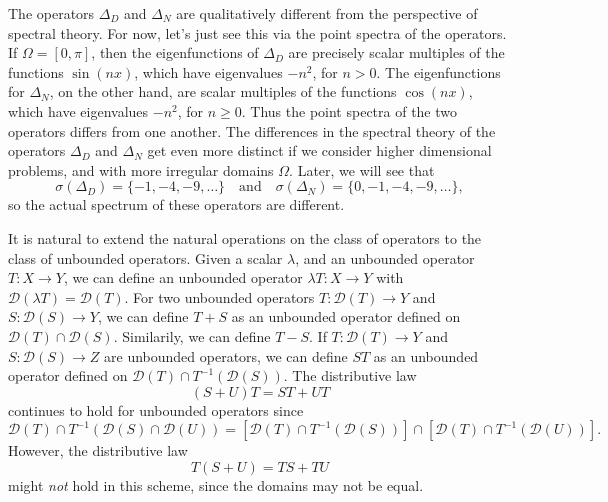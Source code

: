 The operators $\Delta_D$ and $\Delta_N$ are qualitatively different from the perspective of spectral theory. For now, let's just see this via the point spectra of the operators. If $\Omega = [0,\pi]$, then the eigenfunctions of $\Delta_D$ are precisely scalar multiples of the functions $\sin(nx)$, which have eigenvalues $-n^2$, for $n > 0$. The eigenfunctions for $\Delta_N$, on the other hand, are scalar multiples of the functions $\cos(nx)$, which have eigenvalues $-n^2$, for $n \geq 0$. Thus the point spectra of the two operators differs from one another. The differences in the spectral theory of the operators $\Delta_D$ and $\Delta_N$ get even more distinct if we consider higher dimensional problems, and with more irregular domains $\Omega$. Later, we will see that
%
\[ \sigma(\Delta_D) = \{ -1, -4, -9, \dots \} \quad\text{and}\quad \sigma(\Delta_N) = \{ 0, -1, -4, -9, \dots \}, \]
%
so the actual spectrum of these operators are different.

It is natural to extend the natural operations on the class of operators to the class of unbounded operators. Given a scalar $\lambda$, and an unbounded operator $T: X \to Y$, we can define an unbounded operator $\lambda T: X \to Y$ with $\mathcal{D}(\lambda T) = \mathcal{D}(T)$. For two unbounded operators $T: \mathcal{D}(T) \to Y$ and $S: \mathcal{D}(S) \to Y$, we can define $T + S$ as an unbounded operator defined on $\mathcal{D}(T) \cap \mathcal{D}(S)$. Similarily, we can define $T - S$. If $T: \mathcal{D}(T) \to Y$ and $S: \mathcal{D}(S) \to Z$ are unbounded operators, we can define $ST$ as an unbounded operator defined on $\mathcal{D}(T) \cap T^{-1}(\mathcal{D}(S))$. The distributive law
%
\[ (S + U)T = ST + UT \]
%
continues to hold for unbounded operators since
%
\[ \mathcal{D}(T) \cap T^{-1}(\mathcal{D}(S) \cap \mathcal{D}(U)) = \left[ \mathcal{D}(T) \cap T^{-1}(\mathcal{D}(S)) \right] \cap \left[ \mathcal{D}(T) \cap T^{-1}(\mathcal{D}(U)) \right]. \]
%
However, the distributive law
%
\[ T(S + U) = TS + TU \]
%
might \emph{not} hold in this scheme, since the domains may not be equal.

